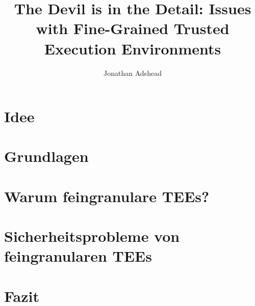\documentclass[sigconf]{acmart}
\title{The Devil is in the Detail: Issues with Fine-Grained Trusted Execution Environments}
\author{Jonathan Adshead}
\affiliation{
    \institution{Friedricht-Alexander-Universität Erlangen-Nürnberg}
    \country{}}
\begin{document}
\maketitle  %

\thispagestyle{plain} %
\pagestyle{plain} %



\section{Idee}


\section{Grundlagen}


\section{Warum feingranulare TEEs?}


\section{Sicherheitsprobleme von feingranularen TEEs}


\section{Fazit}

\end{document}
